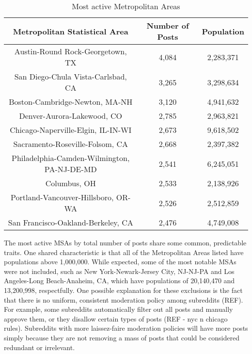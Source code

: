 \documentclass[12pt,oneside, letterpaper]{book}
\begin{document}
\begin{table}[h!]
    \centering
    \small
    \caption{Most active Metropolitan Areas}
    \begin{tabular}{| c | c | c |}
    \hline
    Metropolitan Statistical Area & Number of Posts & Population\\ \hline
    Austin-Round Rock-Georgetown, TX & 4,084 & 2,283,371 \\ \hline
    San Diego-Chula Vista-Carlsbad, CA & 3,265 & 3,298,634 \\ \hline
    Boston-Cambridge-Newton, MA-NH & 3,120 & 4,941,632 \\ \hline
    Denver-Aurora-Lakewood, CO & 2,785 & 2,963,821 \\ \hline
    Chicago-Naperville-Elgin, IL-IN-WI & 2,673 & 9,618,502 \\ \hline
    Sacramento-Roseville-Folsom, CA & 2,668 & 2,397,382 \\ \hline
    Philadelphia-Camden-Wilmington, PA-NJ-DE-MD & 2,541 & 6,245,051 \\ \hline
    Columbus, OH & 2,533 & 2,138,926 \\ \hline
    Portland-Vancouver-Hillsboro, OR-WA & 2,526 & 2,512,859 \\ \hline
    San Francisco-Oakland-Berkeley, CA & 2,476 & 4,749,008 \\ \hline
	\end{tabular}
	\label{table:table-1}
\end{table}

\par The most active MSAs by total number of posts share some common, predictable traits. One shared characteristic is that all of the Metropolitan Areas listed have populations above 1,000,000. While expected, some of the most notable MSAs were not included, such as New York-Newark-Jersey City, NJ-NJ-PA and Los Angeles-Long Beach-Anaheim, CA, which have populations of 20,140,470 and 13,200,998, respectfully. One possible explanation for these exclusions is the fact that there is no uniform, consistent moderation policy among subreddits (REF). For example, some subreddits automatically filter out all posts and manually approve them, or they disallow certain types of posts (REF - nyc n chicago rules). Subreddits with more laissez-faire moderation policies will have more posts simply because they are not removing a mass of posts that could be considered redundant or irrelevant.
\end{document}
